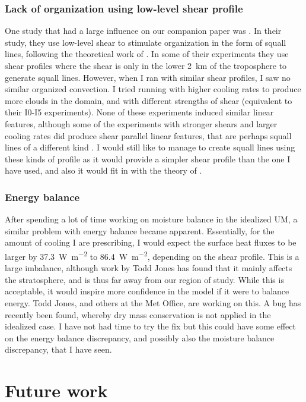 \documentclass[11pt,a4paper]{article}
\begin{document}
\subsubsection{Lack of organization using low-level shear profile}
One study that had a large influence on our companion paper was \cite{RE2001}. In their study, they use low-level shear to stimulate organization in the form of squall lines, following the theoretical work of \cite{RKW1988}. In some of their experiments they use shear profiles where the shear is only in the lower \SI{2}{km} of the troposphere to generate squall lines. However, when I ran with similar shear profiles, I saw no similar organized convection. I tried running with higher cooling rates to produce more clouds in the domain, and with different strengths of shear (equivalent to their I0-I5 experiments). None of these experiments induced similar linear features, although some of the experiments with stronger shears and larger cooling rates did produce shear parallel linear features, that are perhaps squall lines of a different kind \parencite{parker2007simulated}. I would still like to manage to create squall lines using these kinds of profile as it would provide a simpler shear profile than the one I have used, and also it would fit in with the theory of \cite{RKW1988}.

\subsubsection{Energy balance}
After spending a lot of time working on moisture balance in the idealized UM, a similar problem with energy balance became apparent. Essentially, for the amount of cooling I are prescribing, I would expect the surface heat fluxes to be larger by \SI{37.3}{W.m^{-2}} to \SI{86.4}{W.m^{-2}}, depending on the shear profile. This is a large imbalance, although work by Todd Jones has found that it mainly affects the stratosphere, and is thus far away from our region of study. While this is acceptable, it would inspire more confidence in the model if it were to balance energy. Todd Jones, and others at the Met Office, are working on this. A bug has recently been found, whereby dry mass conservation is not applied in the idealized case. I have not had time to try the fix but this could have some effect on the energy balance discrepancy, and possibly also the moisture balance discrepancy, that I have seen.

\section{Future work}
\end{document}
